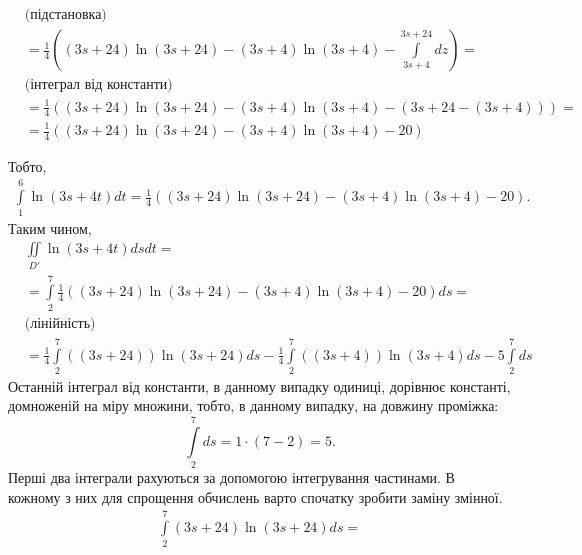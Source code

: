 \begin{example}
\begin{align*}
&\mbox{(підстановка)} &\\[6pt]
&=\frac{1}{4}\left(\left(3 s + 24\right)\ln\left(3 s + 24\right) - \left(3 s + 4\right)\ln\left(3 s + 4\right) - \int\limits_{3 s + 4}^{3 s + 24} d z\right) = & \\[6pt]
&\mbox{(інтеграл від константи)} &\\[6pt]
&=\frac{1}{4}\left(\left(3 s + 24\right)\ln\left(3 s + 24\right) - \left(3 s + 4\right)\ln\left(3 s + 4\right) - \left(3 s + 24 - \left(3 s + 4\right)\right)\right) = & \\[6pt]
&=\frac{1}{4}\left(\left(3 s + 24\right)\ln\left(3 s + 24\right) - \left(3 s + 4\right)\ln\left(3 s + 4\right) - 20\right) &
\end{align*}

Тобто,
\[
\begin{array}{c}
\int\limits_1^6\ln\left(3 s + 4 t\right) d t = \frac{1}{4}\left(\left(3 s + 24\right)\ln\left(3 s + 24\right) - \left(3 s + 4\right)\ln\left(3 s + 4\right) - 20\right).
\end{array}
\]
Таким чином,
\begin{align*}
&\iint\limits_{D'}\ln\left(3 s + 4 t\right) d s d t =&\\
&= \int\limits_2^7 \frac{1}{4}\left(\left(3 s + 24\right)\ln\left(3 s + 24\right) - \left(3 s + 4\right)\ln\left(3 s + 4\right) - 20\right) d s =& \\[6pt]
&\mbox{(лінійність)} &\\[6pt]
&=\frac{1}{4}\int\limits_2^7 \left(\left(3 s + 24\right)\right)\ln\left(3 s + 24\right) d s - \frac{1}{4}\int\limits_2^7 \left(\left(3 s + 4\right)\right) \ln\left(3 s + 4\right) d s - 5 \int\limits_{2}^{7}d s &
\end{align*}
Останній інтеграл від константи, в данному випадку одиниці, дорівнює константі, домноженій на міру множини, тобто, в данному випадку, на довжину проміжка:
\[
 \int\limits_{2}^{7}d s = 1 \cdot \left(7 - 2\right) = 5.
\]
Перші два інтеграли рахуються за допомогою інтегрування частинами. В кожному з них для спрощення обчислень варто спочатку зробити заміну змінної.
\begin{align*}
&\int\limits_2^7 \left(3 s + 24\right)\ln\left(3 s + 24\right) d s = &\\[6pt]

\end{align*}
\end{example}
